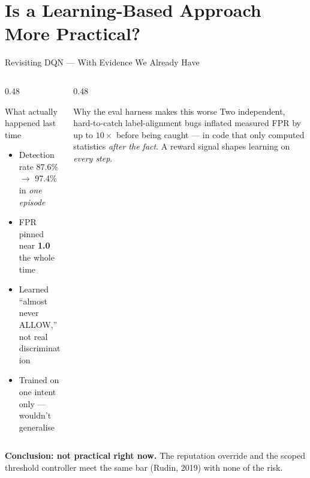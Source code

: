 \documentclass[aspectratio=169, 12pt]{beamer}
\begin{document}
\section{Is a Learning-Based Approach More Practical?}

\begin{frame}{Revisiting DQN --- With Evidence We Already Have}
  \begin{columns}[T]
    \begin{column}{0.48\textwidth}
      \begin{alertblock}{What actually happened last time}
        \begin{itemize}
          \item Detection rate 87.6\% $\to$ 97.4\% in \emph{one episode}
          \item FPR pinned near \textbf{1.0} the whole time
          \item Learned ``almost never ALLOW,'' not real discrimination
          \item Trained on one intent only --- wouldn't generalise
        \end{itemize}
      \end{alertblock}
    \end{column}
    \begin{column}{0.48\textwidth}
      \begin{alertblock}{Why the eval harness makes this worse}
        Two independent, hard-to-catch label-alignment bugs inflated
        measured FPR by up to $10\times$ before being caught --- in code
        that only computed statistics \emph{after the fact}. A reward
        signal shapes learning on \emph{every step}.
      \end{alertblock}
    \end{column}
  \end{columns}
  \vspace{0.4cm}
  \begin{center}
    \large\textcolor{honeyblue}{\textbf{Conclusion: not practical right now.}
    The reputation override and the scoped threshold controller meet the
    same bar (Rudin, 2019) with none of the risk.}
  \end{center}
\end{frame}
\end{document}
